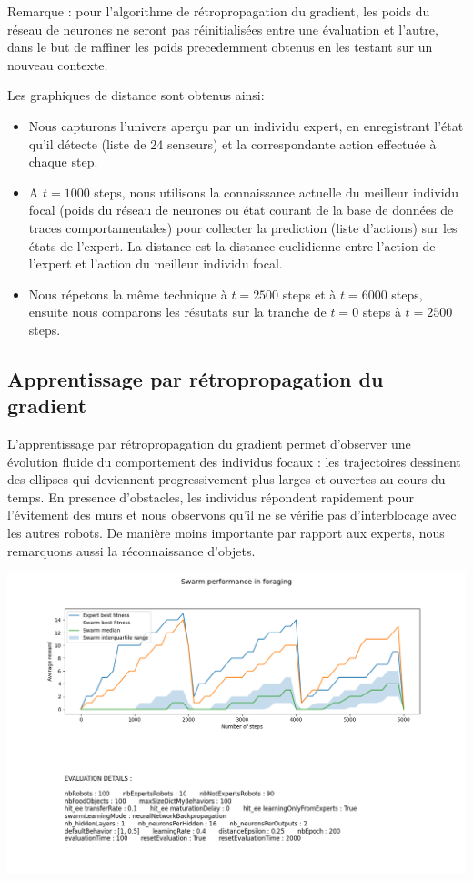 \documentclass[a4paper, 12pt]{report}
\begin{document}
    Remarque : pour l'algorithme de rétropropagation du gradient, les poids du réseau de neurones ne seront pas réinitialisées entre une évaluation et l'autre, dans le but de raffiner les poids precedemment obtenus en les testant sur un nouveau contexte.
    
    Les graphiques de distance sont obtenus ainsi:
    \begin{itemize}
        \item Nous capturons l'univers aperçu par un individu expert, en enregistrant l'état qu'il détecte (liste de 24 senseurs) et la correspondante action effectuée à chaque step.
        \item A $t = 1000$ steps, nous utilisons la connaissance actuelle du meilleur individu focal (poids du réseau de neurones ou état courant de la base de données de traces comportamentales) pour collecter la prediction (liste d'actions) sur les états de l'expert. La distance est la distance euclidienne entre l'action de l'expert et l'action du meilleur individu focal.
        \item Nous répetons la même technique à $t = 2500$ steps et à $t = 6000$ steps, ensuite nous comparons les résutats sur la tranche de $t = 0$ steps à $t = 2500$ steps.
    \end{itemize}


	
	
    \subsection{Apprentissage par rétropropagation du gradient}
    L'apprentissage par rétropropagation du gradient permet d'observer une évolution fluide du comportement des individus focaux : les trajectoires dessinent des ellipses qui deviennent progressivement plus larges et ouvertes au cours du temps. En presence d'obstacles, les individus répondent rapidement pour l'évitement des murs et nous observons qu'il ne se vérifie pas d'interblocage avec les autres robots. De manière moins importante par rapport aux experts, nous remarquons aussi la réconnaissance d'objets.
    
    \includegraphics[scale=0.5]{Compte_Rendu/images/bp6000_100.png}
    
\end{document}
